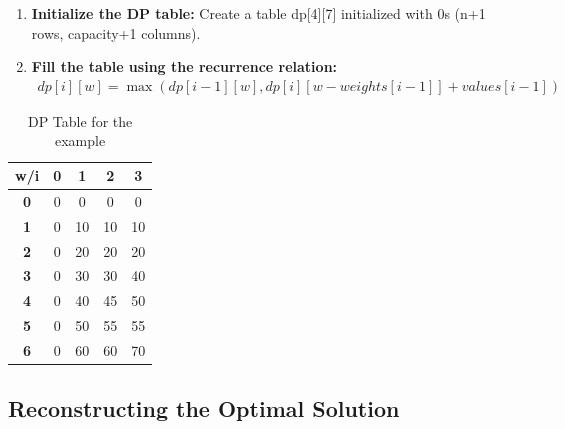 \documentclass{article}
\begin{document}
\begin{enumerate}[leftmargin=*]
    \item \textbf{Initialize the DP table:} Create a table dp[4][7] initialized with 0s (n+1 rows, capacity+1 columns).
    
    \item \textbf{Fill the table using the recurrence relation:}
    \begin{align}
    dp[i][w] = \max(dp[i-1][w], dp[i][w-weights[i-1]] + values[i-1])
    \end{align}
\end{enumerate}

\begin{table}[htbp]
\centering
\begin{tabular}{|c|c|c|c|c|}
\hline
\rowcolor{gray!20}
\textbf{w/i} & \textbf{0} & \textbf{1} & \textbf{2} & \textbf{3} \\
\hline
\textbf{0} & 0 & 0 & 0 & 0 \\
\hline
\textbf{1} & 0 & 10 & 10 & 10 \\
\hline
\textbf{2} & 0 & 20 & 20 & 20 \\
\hline
\textbf{3} & 0 & 30 & 30 & 40 \\
\hline
\textbf{4} & 0 & 40 & 45 & 50 \\
\hline
\textbf{5} & 0 & 50 & 55 & 55 \\
\hline
\textbf{6} & 0 & 60 & 60 & 70 \\
\hline
\end{tabular}
\caption{DP Table for the example}
\end{table}

\subsection{Reconstructing the Optimal Solution}
\end{document}
